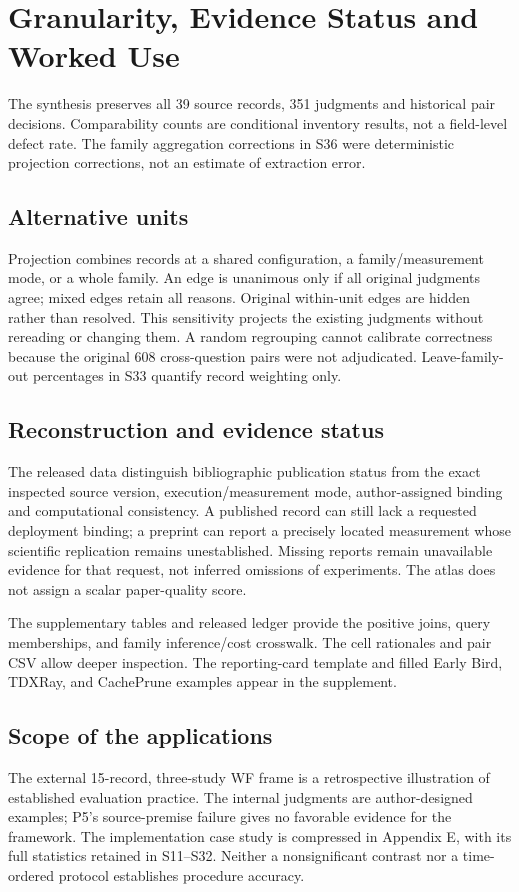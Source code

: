 \section{Granularity, Evidence Status and Worked Use}\label{app:r33}
The synthesis preserves all 39 source records, 351 judgments and historical pair decisions. Comparability counts are conditional inventory results, not a field-level defect rate. The family aggregation corrections in S36 were deterministic projection corrections, not an estimate of extraction error.
\subsection{Alternative units}

Projection combines records at a shared configuration, a family/measurement mode, or a whole family. An edge is unanimous only if all original judgments agree; mixed edges retain all reasons. Original within-unit edges are hidden rather than resolved. This sensitivity projects the existing judgments without rereading or changing them. A random regrouping cannot calibrate correctness because the original 608 cross-question pairs were not adjudicated. Leave-family-out percentages in S33 quantify record weighting only.
\subsection{Reconstruction and evidence status}
The released data distinguish bibliographic publication status from the exact inspected source version, execution/measurement mode, author-assigned binding and computational consistency. A published record can still lack a requested deployment binding; a preprint can report a precisely located measurement whose scientific replication remains unestablished. Missing reports remain unavailable evidence for that request, not inferred omissions of experiments. The atlas does not assign a scalar paper-quality score.

The supplementary tables and released ledger provide the positive joins, query memberships, and family inference/cost crosswalk. The cell rationales and pair CSV allow deeper inspection. The reporting-card template and filled Early Bird, TDXRay, and CachePrune examples appear in the supplement.
\subsection{Scope of the applications}
The external 15-record, three-study WF frame is a retrospective illustration of established evaluation practice. The internal judgments are author-designed examples; P5's source-premise failure gives no favorable evidence for the framework. The implementation case study is compressed in Appendix E, with its full statistics retained in S11--S32. Neither a nonsignificant contrast nor a time-ordered protocol establishes procedure accuracy.

